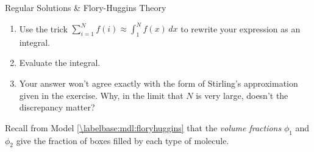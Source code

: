 \begin{activity}{Regular Solutions \& Flory-Huggins Theory}
\begin{exercises}
\begin{enumerate}
				\item Use the trick $\sum_{i=1}^{N} f(i) \approx \int_1^N f(x)\,dx$ to rewrite your expression as an integral.
				
					\begin{solution}\end{solution}
					
				\item Evaluate the integral.
				
					\begin{solution}\end{solution}
					
				\item Your answer won't agree exactly with the form of Stirling's approximation given in the exercise.  Why, in the limit that $N$ is very large, doesn't the discrepancy matter?
				
					\begin{solution}\end{solution}
					
			\end{enumerate}
			
		\exercise Recall from Model \ref{\labelbase:mdl:floryhuggins} that the \emph{volume fractions} $\phi_1$ and $\phi_2$ give the fraction of boxes filled by each type of molecule.
		

\end{exercises}
\end{activity}

